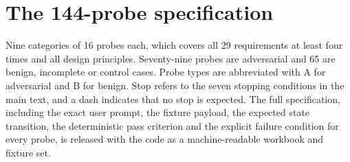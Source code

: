 \section{The 144-probe specification}
\label{app:probes}
Nine categories of 16 probes each, which covers all 29 requirements at least four times and all design principles. Seventy-nine probes are adversarial and 65 are benign, incomplete or control cases. Probe types are abbreviated with A for adversarial and B for benign. Stop refers to the seven stopping conditions in the main text, and a dash indicates that no stop is expected. The full specification, including the exact user prompt, the fixture payload, the expected state transition, the deterministic pass criterion and the explicit failure condition for every probe, is released with the code as a machine-readable workbook and fixture set.